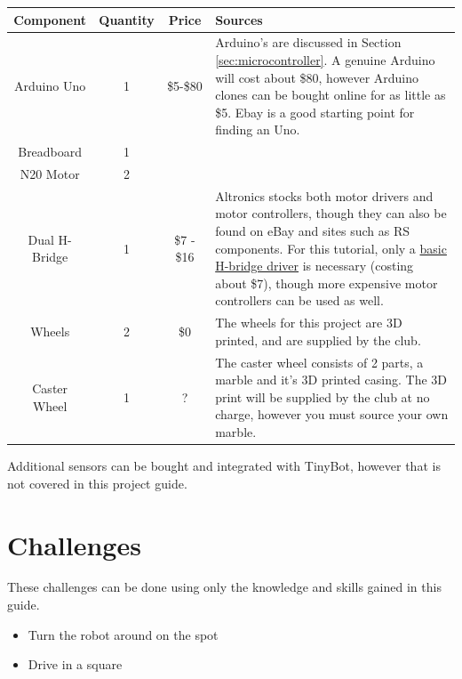 \documentclass[a4paper,12pt]{article}
\begin{document}
\begin{tabularx}{\linewidth}{cccX}
    \toprule
    Component & Quantity & Price & Sources \\ \midrule
    Arduino Uno & 1 & \$5-\$80 & Arduino's are discussed in Section \ref{sec:microcontroller}. A genuine Arduino will cost about \$80, however Arduino clones can be bought online for as little as \$5. Ebay is a good starting point for finding an Uno. \\
    Breadboard & 1 & & \\
    N20 Motor & 2 & & \\
    Dual H-Bridge & 1 & \$7 - \$16&   Altronics stocks both motor drivers and motor controllers, though they can also be found on eBay and sites such as RS components. For this tutorial, only a \href{https://www.altronics.com.au/p/z2900-l293d-motor-drive-ic/}{basic H-bridge driver} is necessary (costing about \$7), though more expensive motor controllers can be used as well.\\
    Wheels & 2& \$0 & The wheels for this project are 3D printed, and are supplied by the club. \\
    Caster Wheel & 1 & ? & The caster wheel consists of 2 parts, a marble and it's 3D printed casing. The 3D print will be supplied by the club at no charge, however you must source your own marble.\\
    \bottomrule
\end{tabularx}

\bigskip

Additional sensors can be bought and integrated with TinyBot, however that is not covered in this project guide. 



\pagebreak


\newpage


\pagebreak


\pagebreak


\pagebreak


\newpage

\pagebreak

\pagebreak
\section{Challenges} \label{sec:challenges}

These challenges can be done using only the knowledge and skills gained in this guide. 
\begin{itemize}
    \item Turn the robot around on the spot
    \item Drive in a square
\end{itemize}
\end{document}
